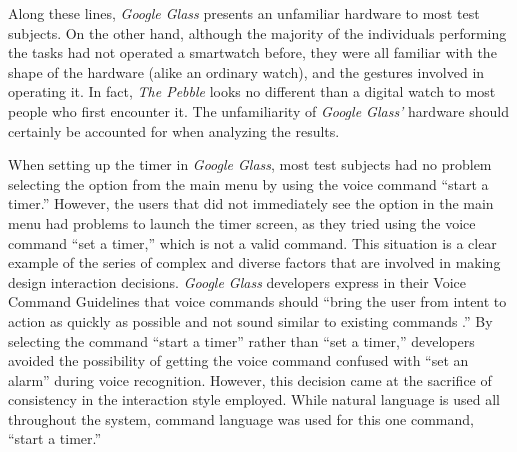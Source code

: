 \documentclass[11pt,a4paper]{scrartcl}
\begin{document}
Along these lines, \textit{Google Glass} presents an unfamiliar hardware to most test subjects. On the other hand, although the majority of the individuals performing the tasks had not operated a smartwatch before, they were all familiar with the shape of the hardware (alike an ordinary watch), and the gestures involved in operating it. In fact, \textit{The Pebble} looks no different than a digital watch to most people who first encounter it. The unfamiliarity of \textit{Google Glass'} hardware should certainly be accounted for when analyzing the results.

When setting up the timer in \textit{Google Glass}, most test subjects had no problem selecting the option from the main menu by using the voice command ``start a timer.'' However, the users that did not immediately see the option in the main menu had problems to launch the timer screen, as they tried using the voice command ``set a timer,'' which is not a valid command.
This situation is a clear example of the series of complex and diverse factors that are involved in making design interaction decisions. \textit{Google Glass} developers express in their Voice Command Guidelines that voice commands should ``bring the user from intent to action as quickly as possible and not sound similar to existing commands \cite{google02}.'' By selecting the command ``start a timer'' rather than ``set a timer,'' developers avoided the possibility of getting the voice command confused with ``set an alarm'' during voice recognition. However, this decision came at the sacrifice of consistency in the interaction style employed. While natural language is used all throughout the system, command language was used for this one command, ``start a timer.''
\end{document}
